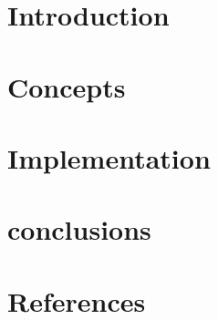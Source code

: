 \section[Intro]{Introduction}



\section[Con]{Concepts}



\section[Impl]{Implementation}



\section[End]{conclusions}


\section[Refs]{References}

